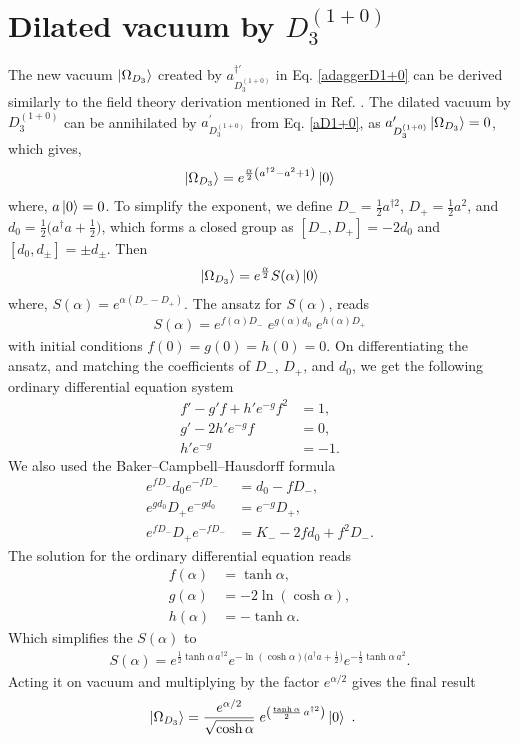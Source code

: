 \documentclass[%
 reprint,
superscriptaddress,
 amsmath,amssymb,
 aps,
]{revtex4-2}
\begin{document}
\section{Dilated vacuum by $D_{3}^{(1+0)}$} 
\label{Dilated-vacuum}
The new vacuum $\ket{\Omega_{D_{3}}}$ created by $a^{\dagger\prime}_{D^{(1+0)}_{3}}$ in Eq. \ref{adaggerD1+0} can be derived similarly to the field theory derivation mentioned in Ref. \cite{umezawa1982thermo}. The dilated vacuum by $D_{3}^{(1+0)}$ can be annihilated by $a^{\prime}_{D^{(1+0)}_{3}}$ from Eq. \ref{aD1+0}, as $ a^{\prime}_{D^{(1+0)}_{3}}\ket{\Omega_{D_{3}}}=0$, which gives, 
\begin{align}
    \ket{\Omega_{D_{3}}}=e^{\frac{\alpha}{2}\left(a^{\dagger 2} - a^2+1\right)}\ket{0}
\end{align}
where, $a\ket{0}=0$. To simplify the exponent, we define $D_{-}=\frac12 a^{\dagger2}$, $D_{+}=\frac12 a^{2}$, and $d_{0}=\frac12\bigl(a^{\dagger}a+\tfrac12\bigr)$, which forms a closed group as $[D_{-},D_{+}]=-2d_{0}$ and $[d_{0},d_{\pm}]=\pm d_{\pm}$. Then
\begin{align}
    \ket{\Omega_{D_{3}}}=e^{\frac{\alpha}{2}}S(\alpha)\ket{0}
\end{align}
where, $S(\alpha)=e^{\alpha(D_{-}-D_{+})}$. The ansatz for $S(\alpha)$, reads
\begin{align}
S(\alpha)=e^{f(\alpha)D_{-}}\;e^{g(\alpha)d_{0}}\;e^{h(\alpha)D_{+}}
\end{align}
with initial conditions $f(0)=g(0)=h(0)=0$. On differentiating the ansatz, and matching the coefficients of $D_{-}$, $D_{+}$, and $d_{0}$, we get the following ordinary differential equation system
\begin{align}
f'-g'f+h'e^{-g}f^{2}&=1,\\
g'-2h'e^{-g}f&=0,\\
h'e^{-g}&=-1.
\end{align}
We also used the Baker–Campbell–Hausdorff formula
\begin{align}
    e^{f D_{-}}d_{0}e^{-f D_{-}}&=d_{0}-f D_{-},\\
e^{g d_{0}}D_{+}e^{-g d_{0}}&=e^{-g}D_{+},\\
e^{f D_{-}}D_{+}e^{-f D_{-}}&=K_{-}-2fd_{0}+f^{2}D_{-}.
\end{align}
The solution for the ordinary differential equation reads 
\begin{align}
    f(\alpha)&=\tanh\alpha,\\
g(\alpha)&=-2\ln(\cosh\alpha),\\
h(\alpha)&=-\tanh\alpha.
\end{align}
Which simplifies the $S(\alpha)$ to 
\begin{align}
    S(\alpha)
   =e^{\tfrac12\tanh\alpha\,a^{\dagger2}} e^{-\ln(\cosh\alpha)\bigl(a^{\dagger}a+\tfrac12\bigr)} e^{-\tfrac12\tanh\alpha\,a^{2}}.
\end{align}
Acting it on vacuum and multiplying by the factor \(e^{\alpha/2}\) gives the final result
\begin{align}
    \ket{\Omega_{D_{3}}}&=\frac{e^{\alpha/2}}{\sqrt{\cosh\alpha}}\;
     e^{\left(\frac{\tanh\alpha}{2}\,a^{\dagger2}\right)}\ket{0}~.
\end{align}
\end{document}
